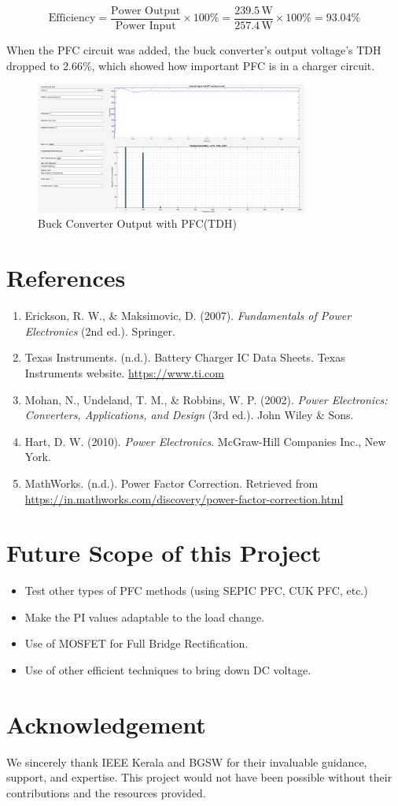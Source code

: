 \documentclass[12pt]{article}
\begin{document}
\[
\text{Efficiency} = \frac{\text{Power Output}}{\text{Power Input}} \times 100\% = \frac{239.5\,\text{W}}{257.4\,\text{W}} \times 100\% = 93.04\%
\]

When the PFC circuit was added, the buck converter’s output voltage’s TDH dropped to 2.66\%, which showed how important PFC is in a charger circuit.
\begin{figure}[h]
    \centering
    \includegraphics[width=0.8\textwidth]{img/Vout_with_PFC.png}
    \caption{Buck Converter Output with PFC(TDH)}
\end{figure}
\newpage
\section*{References}
\begin{enumerate}
    \item Erickson, R. W., \& Maksimovic, D. (2007). \textit{Fundamentals of Power Electronics} (2nd ed.). Springer.
    \item Texas Instruments. (n.d.). Battery Charger IC Data Sheets. Texas Instruments website. \url{https://www.ti.com}
    \item Mohan, N., Undeland, T. M., \& Robbins, W. P. (2002). \textit{Power Electronics: Converters, Applications, and Design} (3rd ed.). John Wiley \& Sons.
    \item Hart, D. W. (2010). \textit{Power Electronics}. McGraw-Hill Companies Inc., New York.
    \item MathWorks. (n.d.). Power Factor Correction. Retrieved from \url{https://in.mathworks.com/discovery/power-factor-correction.html}
\end{enumerate}

\section*{Future Scope of this Project}
\begin{itemize}
    \item Test other types of PFC methods (using SEPIC PFC, CUK PFC, etc.)
    \item Make the PI values adaptable to the load change.
    \item Use of MOSFET for Full Bridge Rectification.
    \item Use of other efficient techniques to bring down DC voltage.
\end{itemize}

\section*{Acknowledgement}
We sincerely thank IEEE Kerala and BGSW for their invaluable guidance, support, and expertise. This project would not have been possible without their contributions and the resources provided.
\end{document}
